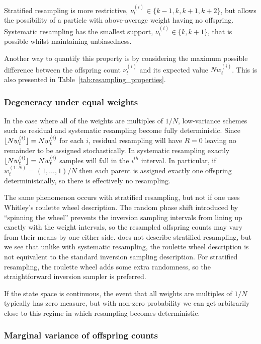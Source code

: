 Stratified resampling is more restrictive, $\nu_t^{(i)} \in \{k-1, k, k+1, k+2\}$, but allows the possibility of a particle with above-average weight having no offspring. 
Systematic resampling has the smallest support, $\nu_t^{(i)} \in \{k, k+1\}$, that is possible whilst maintaining unbiasedness.

Another way to quantify this property is by considering the maximum possible difference between the offspring count $\nu_t^{(i)}$ and its expected value $N w_t^{(i)}$. This is also presented in Table~\ref{tab:resampling_properties}.




\subsubsection{Degeneracy under equal weights \seb{$\checkmark$} }
In the case where all of the weights are multiples of $1/N$, low-variance schemes such as residual and systematic resampling become fully deterministic. 
Since $\lfloor N w_t^{(i)} \rfloor = Nw_t^{(i)}$ for each $i$, residual resampling will have $R=0$ leaving no remainder to be assigned stochastically. 
In systematic resampling exactly $\lfloor N w_t^{(i)} \rfloor = Nw_t^{(i)}$ samples will fall in the $i^{th}$ interval.
In particular, if $w_t^{(1:N)} = (1,\dots, 1)/N$ then each parent is assigned exactly one offspring deterministcially, so there is effectively no resampling.

The same phenomenon occurs with stratified resampling, but not if one uses Whitley's roulette wheel description. The random phase shift introduced by ``spinning the wheel'' prevents the inversion sampling intervals from lining up exactly with the weight intervals, so the resampled offspring counts may vary from their means by one either side.
\textcite{whitley1994} does not describe stratified resampling, but we see that unlike with systematic resampling, the roulette wheel description is not equivalent to the standard inversion sampling description. 
For stratified resampling, the roulette wheel adds some extra randomness, so the straightforward inversion sampler is preferred.

If the state space is continuous, the event that all weights are multiples of $1/N$ typically has zero measure, but with non-zero probability we can get arbitrarily close to this regime in which resampling becomes deterministic.




\subsubsection{Marginal variance of offspring counts \seb{$\checkmark$} }

